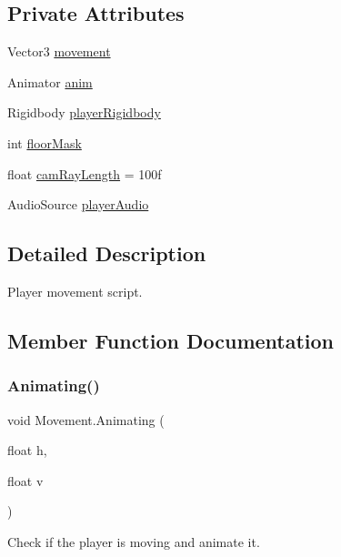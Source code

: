 \subsection*{Private Attributes}
\begin{DoxyCompactItemize}
\item 
Vector3 \mbox{\hyperlink{class_movement_a8d56dc9363b52aaf18d635fea6f85b57}{movement}}
\item 
Animator \mbox{\hyperlink{class_movement_ad8e9965347ca0aedcea1f433bb6d0445}{anim}}
\item 
Rigidbody \mbox{\hyperlink{class_movement_aa619dd60eb0edd2b483e3a131e3dfadf}{player\+Rigidbody}}
\item 
int \mbox{\hyperlink{class_movement_a2f50f37e86cb6008f7a9553bec88a064}{floor\+Mask}}
\item 
float \mbox{\hyperlink{class_movement_a1951fc837158541258958a593fd2ba5e}{cam\+Ray\+Length}} = 100f
\item 
Audio\+Source \mbox{\hyperlink{class_movement_a91fa059bfde2c3fa3423fe308ec7c4ed}{player\+Audio}}
\end{DoxyCompactItemize}


\subsection{Detailed Description}
Player movement script. 

\subsection{Member Function Documentation}
\mbox{\label{class_movement_a02aa2c49bafdcf2f0493dd1dc4df1e34}} 
\subsubsection{\texorpdfstring{Animating()}{Animating()}}
{\footnotesize\ttfamily void Movement.\+Animating (\begin{DoxyParamCaption}\item[{float}]{h,  }\item[{float}]{v }\end{DoxyParamCaption})\hspace{0.3cm}{\ttfamily [private]}}



Check if the player is moving and animate it. 


